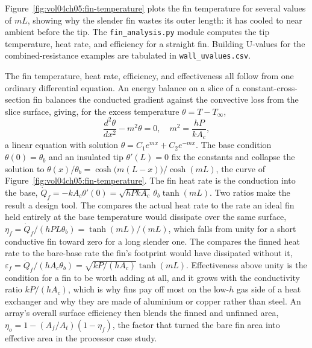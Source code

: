 

Figure~\ref{fig:vol04ch05:fin-temperature} plots the fin temperature for
several values of $mL$, showing why the slender fin wastes its outer
length: it has cooled to near ambient before the tip. The
\texttt{fin\_analysis.py} module computes the tip temperature, heat
rate, and efficiency for a straight fin. Building U-values for the
combined-resistance examples are tabulated in \texttt{wall\_uvalues.csv}.

\begin{mastery}
The fin temperature, heat rate, efficiency, and effectiveness all follow
from one ordinary differential equation. An energy balance on a slice of
a constant-cross-section fin balances the conducted gradient against the
convective loss from the slice surface, giving, for the excess
temperature $\theta = T - T_\infty$,
\[
\frac{d^2\theta}{dx^2} - m^2 \theta = 0, \quad m^2 = \frac{hP}{k A_c},
\]
a linear equation with solution $\theta = C_1 e^{mx} + C_2 e^{-mx}$. The
base condition $\theta(0) = \theta_b$ and an insulated tip
$\theta'(L) = 0$ fix the constants and collapse the solution to
$\theta(x)/\theta_b = \cosh\!\big(m(L-x)\big)/\cosh(mL)$, the curve of
Figure~\ref{fig:vol04ch05:fin-temperature}. The fin heat rate is the
conduction into the base, $\dot{Q}_f = -k A_c \theta'(0) = \sqrt{h P k
A_c}\,\theta_b \tanh(mL)$. Two ratios make the result a design tool. The
 compares the actual heat rate to the rate an
ideal fin held entirely at the base temperature would dissipate over the
same surface, $\eta_f = \dot{Q}_f/(h P L \theta_b) = \tanh(mL)/(mL)$,
which falls from unity for a short conductive fin toward zero for a long
slender one. The  compares the finned heat
rate to the bare-base rate the fin's footprint would have dissipated
without it, $\varepsilon_f = \dot{Q}_f/(h A_c \theta_b) =
\sqrt{kP/(hA_c)}\tanh(mL)$. Effectiveness above unity is the condition
for a fin to be worth adding at all, and it grows with the conductivity
ratio $kP/(hA_c)$, which is why fins pay off most on the low-$h$ gas side
of a heat exchanger and why they are made of aluminium or copper rather
than steel. An array's overall surface efficiency then blends the finned
and unfinned area, $\eta_o = 1 - (A_f/A_t)(1 - \eta_f)$, the factor that
turned the bare fin area into effective area in the processor case study.
\end{mastery}

